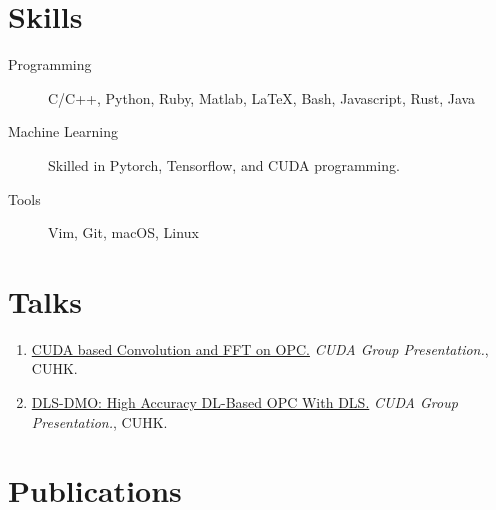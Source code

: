 \documentclass{mycv}
\begin{document}
\section{Skills}

\begin{description}
  \item[Programming] C/C++, Python, Ruby, Matlab, \LaTeX, Bash, Javascript, Rust, Java
  \item[Machine Learning] Skilled in Pytorch, Tensorflow, and CUDA programming.
  \item[Tools] Vim, Git, macOS, Linux
\end{description}

\section{Talks}

\begin{enumerate}
  \item \href{https://dekura.github.io/data/slides/20200321-fft.pdf}{CUDA based Convolution and FFT on OPC.} \emph{CUDA Group Presentation.}, CUHK. 
  \item \href{https://dekura.github.io/data/slides/20200514-opc.pdf}{DLS-DMO: High Accuracy DL-Based OPC With DLS.} \emph{CUDA Group Presentation.}, CUHK. 
\end{enumerate}

\section{Publications}%

\end{document}
